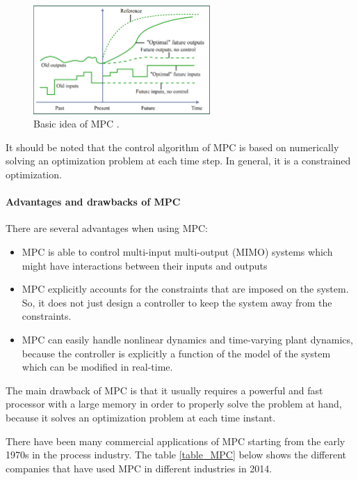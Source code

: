 \documentclass{thesisreport}
\begin{document}
 
 \begin{figure}[h]
 \centering
 \includegraphics[width=0.6\textwidth]{Images/control/MPC_general_idea}
 \caption{Basic idea of MPC \cite{How2008}.}
 \label{MPC_basic_idea}
\end{figure}  
 
\noindent It should be noted that the control algorithm of MPC is based on numerically solving an optimization problem at each time step. In general, it is a constrained optimization.
 
 \paragraph{Advantages and drawbacks of MPC} There are several advantages when using MPC: 
 
 \begin{itemize}
 	\item MPC is able to control multi-input multi-output (MIMO) systems which might have interactions between their inputs and outputs
 	\item MPC explicitly accounts for the constraints that are imposed on the system. So, it does not just design a controller to keep the system away from the constraints.
 	\item MPC can easily handle nonlinear dynamics and time-varying plant dynamics, because the controller is explicitly a function of the model of the system which can be modified in real-time.
 \end{itemize}

\noindent The main drawback of MPC is that it usually requires a powerful and fast processor with a large memory in order to properly solve the problem at hand, because it solves an optimization problem at each time instant.
 
\noindent There have been many commercial applications of MPC starting from the early 1970s in the process industry. The table \ref{table_MPC} below shows the different companies that have used MPC in different industries in 2014.
 
\end{document}
